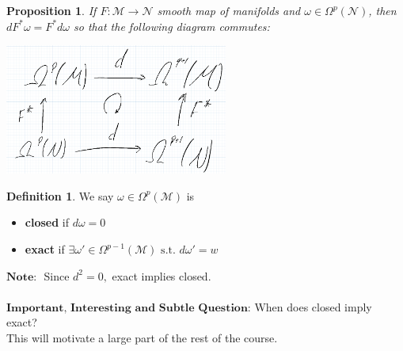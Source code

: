 \documentclass[10pt]{article}
\theoremstyle{plain}
\newtheorem{prop}[thm]{Proposition}
\theoremstyle{definition}
\newtheorem{defn}[thm]{Definition} %
\newcommand{\st}{\text{ s.t. }}
\newcommand{\Note}{\textbf{Note: }}
\newcommand{\man}{\mathcal{M}}
\newcommand{\nan}{\mathcal{N}}
\newcommand{\pformman}[1]{\Omega^{#1}(\man)}
\newcommand{\pformnan}[1]{\Omega^{#1}(\nan)}
\newcommand{\deriv}{d}
\newcommand{\dw}{d\omega}
\begin{document}
\begin{prop}
If $F : \man \to \nan$ smooth map of manifolds and $\omega\in\pformnan{p}$, then $\deriv F^*\omega = F^*\dw$ so that the following diagram commutes:
\begin{center}\includegraphics[width=0.55\textwidth]{Images/PullbackCommutesDifferential.png}\end{center}
\end{prop}
\begin{defn}
We say $\omega\in\pformman{p}$ is 
\begin{itemize}
    \item \textbf{closed} if $\dw = 0$
    \item \textbf{exact} if $\exists \omega' \in \pformman{p-1} \st \dw'=w$
\end{itemize}
\end{defn}
$\Note $ Since $\deriv^2 = 0,$ exact implies closed.
\\\\
$\textbf{Important, Interesting and Subtle Question:}$ When does closed imply exact? \\This will motivate a large part of the rest of the course.
\end{document}

